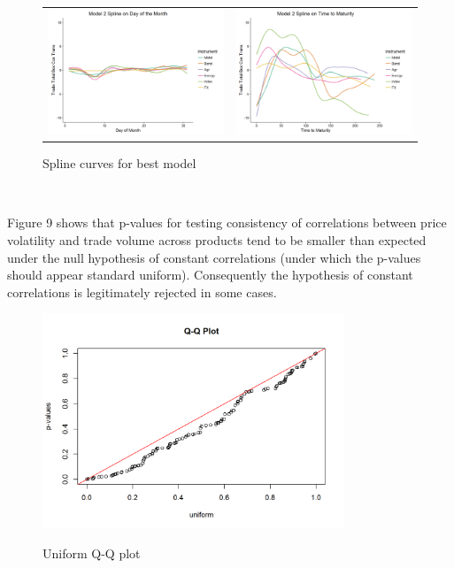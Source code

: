 \documentclass[12pt]{article}
\begin{document}
\begin{figure}[H]
	\begin{center}
		\begin{tabular}{ll}
		\includegraphics[width=8cm]{splineDoM.png}	&
		\includegraphics[width=8cm]{splineTTM.png}	\\		
		\end{tabular}
	\end{center}
	\caption{Spline curves for best model}
	\label{fig:8}
\end{figure}

\

Figure 9 shows that p-values for testing consistency of correlations between price volatility and trade volume across products tend to be smaller than expected under the null hypothesis of constant correlations (under which the p-values should appear standard uniform). Consequently the hypothesis of constant correlations is legitimately rejected in some cases.
\begin{figure}[H]
	\begin{center}
		\includegraphics[width=9cm]{unifQQ2.png}
		 \vspace{-1em}	
		\caption{Uniform Q-Q plot}
		 \vspace{-1em} %
		\label{fig:9}
	\end{center}
\end{figure} 
\end{document}

